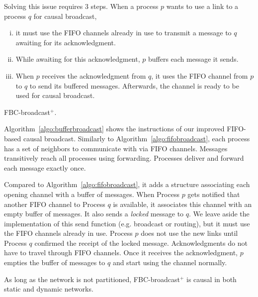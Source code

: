 

Solving this issue requires 3 steps. When a process $p$ wants to use a link to a
process $q$ for causal broadcast,
\begin{enumerate}[(i)]
\item it must use the FIFO channels already in use to transmit a message to $q$
  awaiting for its acknowledgment.
\item While awaiting for this acknowledgment, $p$ buffers each message it
  sends.
\item When $p$ receives the acknowledgment from $q$, it uses the FIFO channel
  from $p$ to $q$ to send its buffered messages. Afterwards, the channel is
  ready to be used for causal broadcast.
\end{enumerate}

\begin{algorithm}[h]
  
  \caption{\label{algo:bufferbroadcast}FBC-broadcast$^+$.}
\end{algorithm}


Algorithm~\ref{algo:bufferbroadcast} shows the instructions of our improved
FIFO-based causal broadcast. Similarly to Algorithm~\ref{algo:fifobroadcast},
each process has a set of neighbors to communicate with via FIFO
channels. Messages transitively reach all processes using forwarding. Processes
deliver and forward each message exactly once.  

Compared to Algorithm~\ref{algo:fifobroadcast}, it adds a structure associating
each opening channel with a buffer of messages. When Process $p$ gets notified
that another FIFO channel to Process $q$ is available, it associates this
channel with an empty buffer of messages. It also sends a \emph{locked} message
to $q$. We leave aside the implementation of this send function (e.g. broadcast
or routing), but it must use the FIFO channels already in use.  Process $p$ does
not use the new links until Process $q$ confirmed the receipt of the locked
message. Acknowledgments do not have to travel through FIFO channels.  Once it
receives the acknowledgment, $p$ empties the buffer of messages to $q$ and start
using the channel normally.

\begin{theorem}
  As long as the network is not partitioned, FBC-broadcast$^+$ is causal in both
  static and dynamic networks.
\end{theorem}

